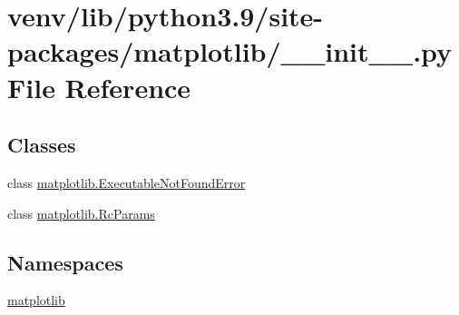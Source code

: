\hypertarget{venv_2lib_2python3_89_2site-packages_2matplotlib_2____init_____8py}{}\section{venv/lib/python3.9/site-\/packages/matplotlib/\+\_\+\+\_\+init\+\_\+\+\_\+.py File Reference}
\label{venv_2lib_2python3_89_2site-packages_2matplotlib_2____init_____8py}
\subsection*{Classes}
\begin{DoxyCompactItemize}
\item 
class \hyperlink{classmatplotlib_1_1ExecutableNotFoundError}{matplotlib.\+Executable\+Not\+Found\+Error}
\item 
class \hyperlink{classmatplotlib_1_1RcParams}{matplotlib.\+Rc\+Params}
\end{DoxyCompactItemize}
\subsection*{Namespaces}
\begin{DoxyCompactItemize}
\item 
 \hyperlink{namespacematplotlib}{matplotlib}
\end{DoxyCompactItemize}
